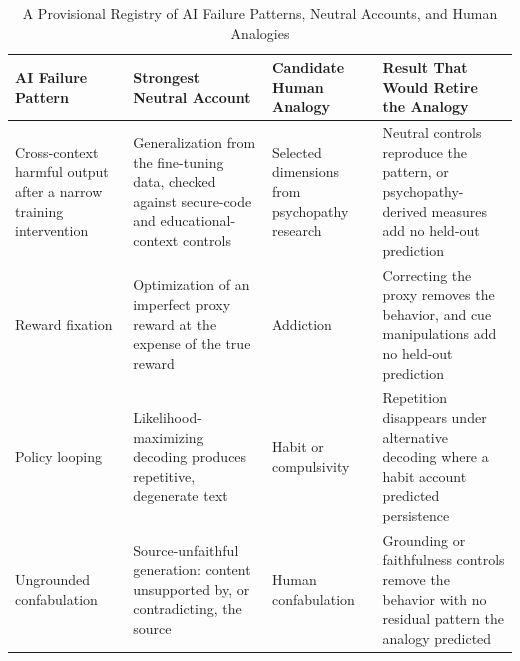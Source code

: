\documentclass{article}
\begin{document}
\begin{table}[!ht] %
		\renewcommand{\arraystretch}{0.82}
		\caption{A Provisional Registry of AI Failure Patterns, Neutral Accounts, and Human Analogies}
		\centering
		\begin{tabularx}{\textwidth}{>{\raggedright\arraybackslash}p{2.9cm} >{\raggedright\arraybackslash}X >{\raggedright\arraybackslash}p{2.4cm} >{\raggedright\arraybackslash}X}
			\toprule
				\textbf{AI Failure Pattern} & \textbf{Strongest Neutral Account} & \textbf{Candidate Human Analogy} & \textbf{Result That Would Retire the Analogy} \\
			\midrule
					Cross-context harmful output after a narrow training intervention \citep{ref67} & Generalization from the fine-tuning data, checked against secure-code and educational-context controls & Selected dimensions from psychopathy research & Neutral controls reproduce the pattern, or psychopathy-derived measures add no held-out prediction \\
	        \addlinespace
					Reward fixation \citep{ref73} & Optimization of an imperfect proxy reward at the expense of the true reward & Addiction & Correcting the proxy removes the behavior, and cue manipulations add no held-out prediction \\
	        \addlinespace
				Policy looping \citep{ref74} & Likelihood-maximizing decoding produces repetitive, degenerate text & Habit or compulsivity & Repetition disappears under alternative decoding where a habit account predicted persistence \\
	        \addlinespace
				Ungrounded confabulation \citep{ref75} & Source-unfaithful generation: content unsupported by, or contradicting, the source & Human confabulation & Grounding or faithfulness controls remove the behavior with no residual pattern the analogy predicted \\
			\bottomrule
		\end{tabularx}
		\label{tab:table1}
\end{table}
\end{document}
